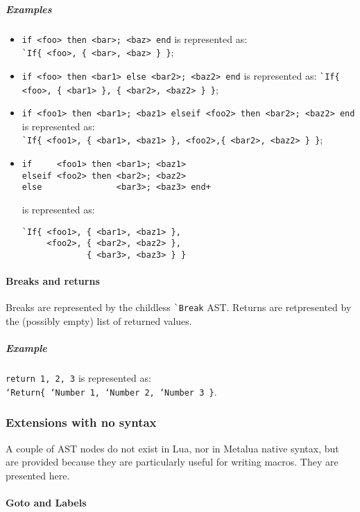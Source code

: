 \subparagraph{Examples}
\begin{itemize}

\item \verb+if <foo> then <bar>; <baz> end+ is represented as:\\
  \verb+`If{ <foo>, { <bar>, <baz> } }+;

\item \verb+if <foo> then <bar1> else <bar2>; <baz2> end+
  is represented as:
  \verb+`If{ <foo>, { <bar1> }, { <bar2>, <baz2> } }+;

\item
  \verb+if <foo1> then <bar1>; <baz1> elseif <foo2> then <bar2>; <baz2> end+
  \\ is represented as: \\
  \verb+`If{ <foo1>, { <bar1>, <baz1> }, <foo2>,{ <bar2>, <baz2> } }+;

\item
\begin{verbatim}
if     <foo1> then <bar1>; <baz1> 
elseif <foo2> then <bar2>; <baz2> 
else               <bar3>; <baz3> end+ 
\end{verbatim}
is represented as:
\begin{verbatim}
`If{ <foo1>, { <bar1>, <baz1> }, 
     <foo2>, { <bar2>, <baz2> },
             { <bar3>, <baz3> } }
\end{verbatim}

\end{itemize}

\paragraph{Breaks and returns} 
Breaks are represented by the childless \verb|`Break| AST. Returns are
retpresented by the (possibly empty) list of returned values.

\subparagraph{Example}
{\tt return 1, 2, 3} is represented as:\\ 
{\tt`Return\{ `Number 1, `Number 2, `Number 3 \}}.

\subsubsection{Extensions with no syntax}

A couple of AST nodes do not exist in Lua, nor in Metalua native
syntax, but are provided because they are particularly useful for
writing macros. They are presented here.

\paragraph{Goto and Labels}

